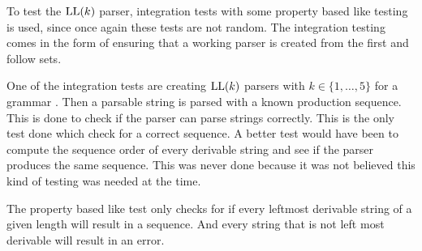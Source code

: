 To test the $\text{LL}(k)$ parser, integration tests with some property based like testing is used, since once again these tests are not random. The integration testing comes in the form of ensuring that a working parser is created from the first and follow sets.

One of the integration tests are creating $\text{LL}(k)$ parsers with $k \in \{1, \dots, 5\}$ for a grammar \cite[45]{Mogensen}. Then a parsable string is parsed with a known production sequence. This is done to check if the parser can parse strings correctly. This is the only test done which check for a correct sequence. A better test would have been to compute the sequence order of every derivable string and see if the parser produces the same sequence. This was never done because it was not believed this kind of testing was needed at the time.

The property based like test only checks for if every leftmost derivable string of a given length will result in a sequence. And every string that is not left most derivable will result in an error. 